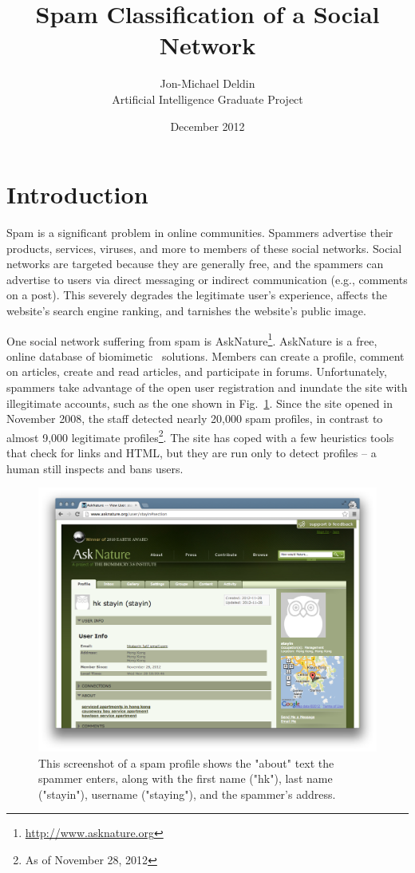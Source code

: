 \documentclass[10pt]{article}
\title{Spam Classification of a Social Network}
\author{Jon-Michael Deldin \\ Artificial Intelligence Graduate Project}
\date{December 2012}
\begin{document}
\maketitle
\tableofcontents
\section{Introduction}
Spam is a significant problem in online communities. Spammers advertise their
products, services, viruses, and more to members of these social networks.
Social networks are targeted because they are generally free, and the spammers
can advertise to users via direct messaging or indirect communication (e.g.,
comments on a post). This severely degrades the legitimate user's experience,
affects the website's search engine ranking, and tarnishes the website's
public image.

One social network suffering from spam is
AskNature\footnote{\url{http://www.asknature.org} }. AskNature is a free,
online database of biomimetic~\cite{benyus} solutions. Members can create a
profile, comment on articles, create and read articles, and participate in
forums. Unfortunately, spammers take advantage of the open user registration
and inundate the site with illegitimate accounts, such as the one shown in
Fig.~\ref{fig:spam-profile}. Since the site opened in November 2008, the staff
detected nearly 20,000 spam profiles, in contrast to almost 9,000 legitimate
profiles\footnote{As of November 28, 2012 }. The site has coped with a few
heuristics tools that check for links and HTML, but they are run only to
detect profiles -- a human still inspects and bans users.

\begin{figure}[t]
  \centering
  \includegraphics[width=\textwidth]{fig/spam-profile.png}
  \caption{This screenshot of a spam profile shows the "about" text the spammer
    enters, along with the first name ("hk"), last name ("stayin"), username
    ("staying"), and the spammer's address.}
  \label{fig:spam-profile}
\end{figure}
\end{document}
